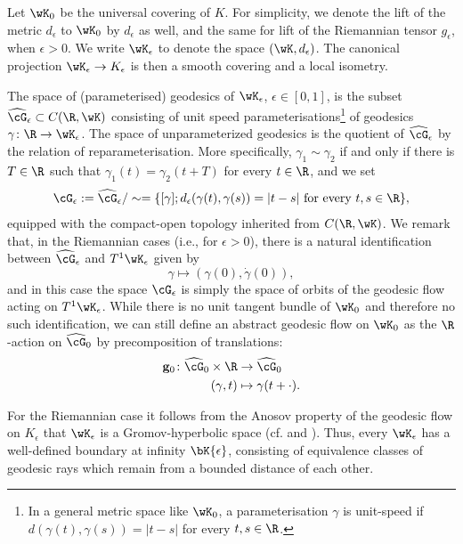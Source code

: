\documentclass[reqno,11pt]{amsart}
\begin{document}
    Let \(\wK_0\) be the universal covering of \(K\).
    For simplicity, we denote the lift of the metric \(d_\epsilon\) to \(\wK_0\) by \(d_\epsilon\) as well, and the same for lift of the Riemannian tensor \(g_\epsilon\), when \(\epsilon > 0\).
    We write \( \wK_\epsilon \) to denote the space \((\wK, d_\epsilon)\).
    The canonical projection \(\wK_\epsilon \to K_\epsilon\) is then a smooth covering and a local isometry. 
    \par The space of (parameterised) geodesics of \(\wK_\epsilon\), \(\epsilon \in [0,1]\), is the subset \( \widehat{\cG}_\epsilon \subset C(\R, \wK)\) consisting of unit speed parameterisations\footnote{
        In a general metric space like \(\wK_0\), a parameterisation \(\gamma\) is unit-speed if \(d(\gamma(t), \gamma(s)) = |t-s|\) for every \(t,s \in \R\). 
    } 
    of geodesics \(\gamma\colon \R \to \wK_\epsilon\).
    The space of unparameterized geodesics is the quotient of \(\widehat{\cG}_\epsilon\) by the relation of reparameterisation.
    More specifically, \(\gamma_1 \sim \gamma_2\) if and only if there is \(T \in \R\) such that \(\gamma_1(t) = \gamma_2(t + T)\) for every \(t \in \R\), and we set
    \[
        \cG_\epsilon := \widehat{\cG}_\epsilon / \sim = \{ [\gamma]; d_\epsilon(\gamma(t), \gamma(s)) = |t-s| \text{ for every } t,s \in \R \},
    \] 
    equipped with the compact-open topology inherited from \( C(\R, \wK) \). 
    We remark that, in the Riemannian cases (i.e., for \(\epsilon > 0\)), there is a natural identification between \(\widehat{\cG}_\epsilon\) and \(T^1\wK_\epsilon\) given by
    \[
        \gamma \mapsto (\gamma(0), \dot\gamma(0)),
    \]
    and in this case the space \(\cG_\epsilon\) is simply the space of orbits of the geodesic flow acting on \(T^1\wK_\epsilon\).
    While there is no unit tangent bundle of \(\wK_0\) and therefore no such identification, we can still define an abstract geodesic flow on \(\wK_0\) as the \(\R\)-action on \(\widehat{\cG}_0\) by precomposition of translations:
    \begin{align*}
        \mathbf{g}_0\colon \widehat{\cG}_0 \times \R &\to \widehat{\cG}_0 \\
        (\gamma, t) &\mapsto \gamma(t + \cdot).
    \end{align*}
    \par For the Riemannian case it follows from the Anosov property of the geodesic flow on \(K_\epsilon\) that \(\wK_\epsilon\) is a Gromov-hyperbolic space (cf. \cite[Appendix B]{guillarmou_geodesic_2022} and \cite{knieper_new_2012}).
    Thus, every \(\wK_\epsilon\) has a well-defined boundary at infinity \(\bK{\epsilon}\), consisting of equivalence classes of geodesic rays which remain from a bounded distance of each other.
\end{document}
